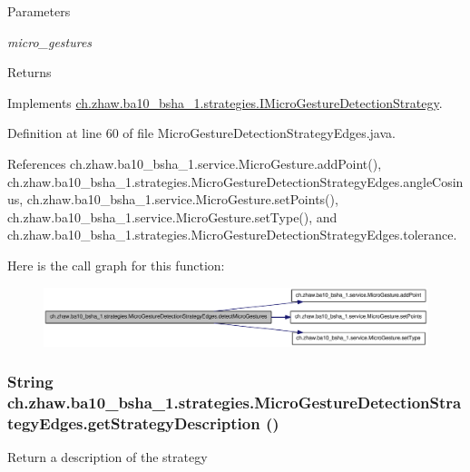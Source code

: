 \begin{DoxyParams}{Parameters}
\item[{\em micro\_\-gestures}]\end{DoxyParams}
\begin{DoxyReturn}{Returns}

\end{DoxyReturn}


Implements \hyperlink{interfacech_1_1zhaw_1_1ba10__bsha__1_1_1strategies_1_1IMicroGestureDetectionStrategy_a8593331fb67e5d4dc890d3db9f2d1b58}{ch.zhaw.ba10\_\-bsha\_\-1.strategies.IMicroGestureDetectionStrategy}.

Definition at line 60 of file MicroGestureDetectionStrategyEdges.java.

References ch.zhaw.ba10\_\-bsha\_\-1.service.MicroGesture.addPoint(), ch.zhaw.ba10\_\-bsha\_\-1.strategies.MicroGestureDetectionStrategyEdges.angleCosinus, ch.zhaw.ba10\_\-bsha\_\-1.service.MicroGesture.setPoints(), ch.zhaw.ba10\_\-bsha\_\-1.service.MicroGesture.setType(), and ch.zhaw.ba10\_\-bsha\_\-1.strategies.MicroGestureDetectionStrategyEdges.tolerance.

Here is the call graph for this function:\nopagebreak
\begin{figure}[H]
\begin{center}
\leavevmode
\includegraphics[width=376pt]{classch_1_1zhaw_1_1ba10__bsha__1_1_1strategies_1_1MicroGestureDetectionStrategyEdges_a16cd0b9ef604ba14a7eb573a77966c4f_cgraph}
\end{center}
\end{figure}
\hypertarget{classch_1_1zhaw_1_1ba10__bsha__1_1_1strategies_1_1MicroGestureDetectionStrategyEdges_ae0338811d57c4b4b96705b71c5edfc43}{
\subsubsection[{getStrategyDescription}]{\setlength{\rightskip}{0pt plus 5cm}String ch.zhaw.ba10\_\-bsha\_\-1.strategies.MicroGestureDetectionStrategyEdges.getStrategyDescription ()}}
\label{classch_1_1zhaw_1_1ba10__bsha__1_1_1strategies_1_1MicroGestureDetectionStrategyEdges_ae0338811d57c4b4b96705b71c5edfc43}
Return a description of the strategy

